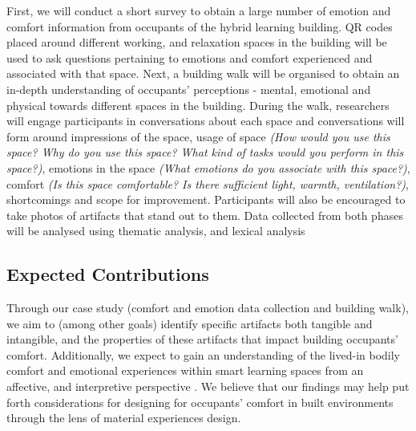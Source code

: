 \documentclass[manuscript, anonymous, review]{acmart}
\begin{document}
First, we will conduct a short survey to obtain a large number of emotion and comfort information from occupants of the hybrid learning building. QR codes placed around different working, and relaxation spaces in the building will be used to ask questions pertaining to emotions and comfort experienced and associated with that space. Next, a building walk will be organised to obtain an in-depth understanding of occupants' perceptions - mental, emotional and physical towards different spaces in the building. During the walk, researchers will engage participants in conversations about each space and conversations will form around impressions of the space, usage of space \textit{(How would you use this space? Why do you use this space? What kind of tasks would you perform in this space?)}, emotions in the space \textit{(What emotions do you associate with this space?)}, comfort \textit{(Is this space comfortable? Is there sufficient light, warmth, ventilation?)}, shortcomings and scope for improvement. Participants will also be encouraged to take photos of artifacts that stand out to them. Data collected from both phases will be analysed using thematic analysis, and lexical analysis \cite{braun2006using, xue2020mood}


\subsection{Expected Contributions}
Through our case study (comfort and emotion data collection and building walk), we aim to (among other goals) identify specific artifacts both tangible and intangible, and the properties of these artifacts that impact building occupants' comfort. Additionally, we expect to gain an understanding of the lived-in bodily comfort and emotional experiences within smart learning spaces from an affective, and interpretive perspective \cite{giaccardi2015foundations}. We believe that our findings may help put forth considerations for designing for occupants' comfort in built environments through the lens of material experiences design. 
\end{document}
